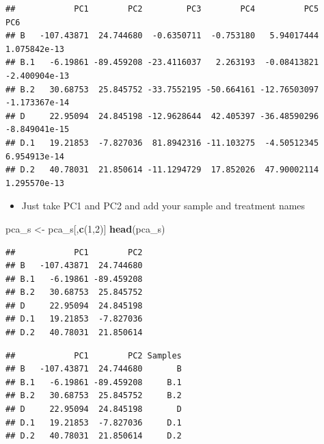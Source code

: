 \documentclass[
]{article}
\newenvironment{Shaded}{\begin{snugshade}}{\end{snugshade}}
\newcommand{\DecValTok}[1]{\textcolor[rgb]{0.00,0.00,0.81}{#1}}
\newcommand{\KeywordTok}[1]{\textcolor[rgb]{0.13,0.29,0.53}{\textbf{#1}}}
\newcommand{\NormalTok}[1]{#1}
\newcommand{\OperatorTok}[1]{\textcolor[rgb]{0.81,0.36,0.00}{\textbf{#1}}}
\newcommand{\StringTok}[1]{\textcolor[rgb]{0.31,0.60,0.02}{#1}}
\providecommand{\tightlist}{%
  \setlength{\itemsep}{0pt}\setlength{\parskip}{0pt}}
\begin{document}
\begin{verbatim}
##            PC1        PC2         PC3        PC4          PC5           PC6
## B   -107.43871  24.744680  -0.6350711  -0.753180   5.94017444  1.075842e-13
## B.1   -6.19861 -89.459208 -23.4116037   2.263193  -0.08413821 -2.400904e-13
## B.2   30.68753  25.845752 -33.7552195 -50.664161 -12.76503097 -1.173367e-14
## D     22.95094  24.845198 -12.9628644  42.405397 -36.48590296 -8.849041e-15
## D.1   19.21853  -7.827036  81.8942316 -11.103275  -4.50512345  6.954913e-14
## D.2   40.78031  21.850614 -11.1294729  17.852026  47.90002114  1.295570e-13
\end{verbatim}

\begin{itemize}
\tightlist
\item
  Just take PC1 and PC2 and add your sample and treatment names
\end{itemize}

\begin{Shaded}
\begin{Highlighting}[]
\NormalTok{pca_s <-}\StringTok{ }\NormalTok{pca_s[,}\KeywordTok{c}\NormalTok{(}\DecValTok{1}\NormalTok{,}\DecValTok{2}\NormalTok{)]}
\KeywordTok{head}\NormalTok{(pca_s)}
\end{Highlighting}
\end{Shaded}

\begin{verbatim}
##            PC1        PC2
## B   -107.43871  24.744680
## B.1   -6.19861 -89.459208
## B.2   30.68753  25.845752
## D     22.95094  24.845198
## D.1   19.21853  -7.827036
## D.2   40.78031  21.850614
\end{verbatim}

\begin{Shaded}
\end{Shaded}

\begin{verbatim}
##            PC1        PC2 Samples
## B   -107.43871  24.744680       B
## B.1   -6.19861 -89.459208     B.1
## B.2   30.68753  25.845752     B.2
## D     22.95094  24.845198       D
## D.1   19.21853  -7.827036     D.1
## D.2   40.78031  21.850614     D.2
\end{verbatim}
\end{document}

